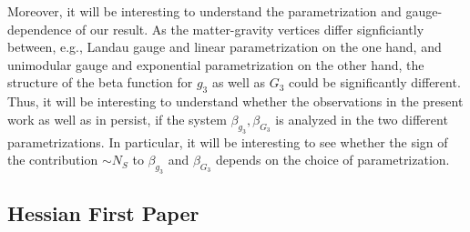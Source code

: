 \documentclass[11pt]{book} %
\numberwithin{equation}{chapter}
\begin{document}
{Moreover, it will be interesting to understand the parametrization and gauge-dependence of our result.
As the matter-gravity vertices differ signficiantly between,
e.g., Landau gauge and linear parametrization on the one hand,
and unimodular gauge and exponential parametrization on the other hand,
the structure of the beta function for $g_3$ as well as $G_3$ could be significantly different.
Thus, it will be interesting to understand whether the observations in the present work as
well as in \cite{Meibohm:2015twa} persist,
if the system $\beta_{g_3}, \beta_{G_3}$ is analyzed in the two different parametrizations.
In particular, it will be interesting to see whether the sign of the contribution
$\sim N_S$ to $\beta_{g_3}$ and $\beta_{G_3}$ depends on the choice of parametrization.




\nocite{*}






\appendix
\begin{appendices}
\chapter{Hessian First Paper}


\end{appendices}}
\end{document}
